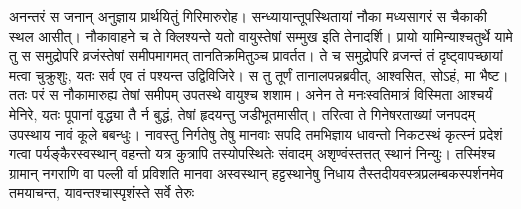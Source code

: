 \vakya अनन्तरं स जनान् अनुज्ञाय प्रार्थयितुं गिरिमारुरोह।
\vakya सन्ध्यायान्तूपस्थितायां नौका मध्यसागरं स चैकाकी स्थल आसीत्।
\vakya नौकावाहने च ते क्लिश्यन्ते यतो वायुस्तेषां सम्मुख इति तेनादर्शि। प्रायो यामिन्याश्चतुर्थे यामे तु स समुद्रोपरि व्रजंस्तेषां समीपमागमत् तानतिक्रमितुञ्च प्रावर्तत।
\vakya ते च समुद्रोपरि व्रजन्तं तं दृष्ट्वापच्छायां मत्वा चुक्रुशुः, यतः सर्व एव तं पश्यन्त उद्विविजिरे।
\vakya स तु तूर्णं तानालपन्नब्रवीत्, आश्वसित, सोऽहं, मा भैष्ट।
\vakya ततः परं स नौकामारुह्य तेषां समीपम् उपतस्थे वायुश्च शशाम।
\vakya अनेन ते मनःस्वतिमात्रं विस्मिता आश्चर्यं मेनिरे, यतः पूपानां वृद्ध्या तै र्न बुद्धं, तेषां हृदयन्तु जडीभूतमासीत्।
\vakya तरित्वा ते गिनेषरताख्यां जनपदम् उपस्थाय नावं कूले बबन्धुः।
\vakya नावस्तु निर्गतेषु तेषु मानवाः सपदि तमभिज्ञाय धावन्तो निकटस्थं कृत्स्नं प्रदेशं गत्वा पर्यङ्कैरस्वस्थान् वहन्तो यत्र कुत्रापि तस्योपस्थितेः संवादम् अशृण्वंस्तत्तत् स्थानं निन्युः।
\vakya तस्मिंश्च ग्रामान् नगराणि वा पल्ली र्वा प्रविशति मानवा अस्वस्थान् हट्टस्थानेषु निधाय तैस्तदीयवस्त्रप्रलम्बकस्पर्शनमेव तमयाचन्त, यावन्तश्चास्पृशंस्ते सर्वे तेरुः\eoc